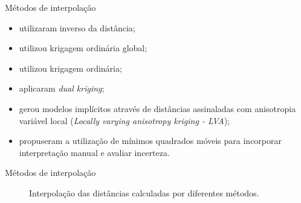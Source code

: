 \documentclass[aspectratio=169]{beamer}
\begin{document}
\begin{frame}{Métodos de interpolação}
	\begin{itemize}
		\item \cite{hosseini_deutsch_iqd} utilizaram inverso da distância;
		\item \cite{silvaenhancedgeomodeling} utilizou krigagem ordinária global;
		\item \cite{rolo_dissertacao} utilizou krigagem ordinária;
		\item \cite{silva_dual} aplicaram \textit{dual kriging};
		\item \cite{boisvert_geomodeling} gerou modelos implícitos através de distâncias assinaladas com anisotropia variável local (\textit{Locally varying anisotropy kriging - LVA});
		\item \cite{manchuck_MLS} propuseram a utilização de mínimos quadrados móveis para incorporar interpretação manual e avaliar incerteza.
	\end{itemize}
\end{frame}

\begin{frame}{Métodos de interpolação}
	\begin{figure}[H] 
		\caption{Interpolação das distâncias calculadas por diferentes métodos.} \label{interpo}
		\centering
	\end{figure}
\end{frame}
\end{document}
